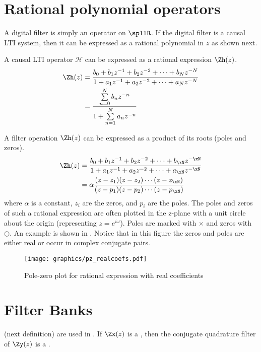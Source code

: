 \section{Rational polynomial operators}
A digital filter is simply an operator on $\spllR$.
If the digital filter is a causal LTI system, then it can be expressed as 
a rational polynomial in $z$ as shown next.

\begin{lemma}
A causal LTI operator $\mathcal{H}$ can be expressed as a rational expression $\Zh(z)$.
\begin{align*}
 \Zh(z) &= \frac{b_0 + b_1z^{-1} + b_2z^{-2} + \cdots + b_Nz^{-N}}
                {1   + a_1z^{-1} + a_2z^{-2} + \cdots + a_Nz^{-N}}
   \\   &= \frac{\sum\limits_{n=0}^{N} b_n z^{-n}}
                {1   + \sum\limits_{n=1}^{N} a_n z^{-n}}
\end{align*}
\end{lemma}


A filter operation $\Zh(z)$ can be expressed as a product of its roots (poles and zeros).
\begin{align*}
 \Zh(z) &= \frac{b_0 + b_1z^{-1} + b_2z^{-2} + \cdots + b_\xN z^{-\xN}}
                {1   + a_1z^{-1} + a_2z^{-2} + \cdots + a_\xN z^{-\xN}}
   \\   &= \alpha\frac{(z-z_1)(z-z_2)\cdots(z-z_\xN)}
                {(z-p_1)(z-p_2)\cdots(z-p_\xN)}
\end{align*}
where $\alpha$ is a constant, $z_i$ are the zeros, and $p_i$ are the poles.
The poles and zeros of such a rational expression are often plotted in the z-plane with a unit circle
about the origin (representing $z=e^{i\omega}$).
Poles are marked with $\times$ and zeros with $\bigcirc$.
An example is shown in .  
Notice that in this figure the zeros and poles are either real or occur in 
complex conjugate pairs.

\begin{figure}[ht]
  \centering
  \texttt{[image: graphics/pz\_realcoefs.pdf]}
  \caption{
     Pole-zero plot for rational expression with real coefficients
     \label{fig:pz}
     }
\end{figure}



\section {Filter Banks}
 (next definition) are used in .
If $\Zx(z)$ is a , then the conjugate quadrature filter of $\Zy(z)$ is a .

